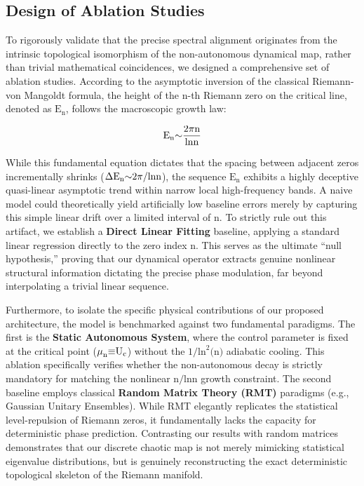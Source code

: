 \documentclass[fractalfract,article,submit,oneauthor,pdftex]{Definitions/mdpi}
\begin{document}
\subsection{Design of Ablation Studies}

To rigorously validate that the precise spectral alignment originates
from the intrinsic topological isomorphism of the non-autonomous
dynamical map, rather than trivial mathematical coincidences, we
designed a comprehensive set of ablation studies. According to the
asymptotic inversion of the classical Riemann-von Mangoldt formula, the
height of the \(\text{n}\)-th Riemann zero on the critical line, denoted
as \(\text{E}_{\text{n}}\), follows the macroscopic growth law:

\begin{equation}
\text{E}_{\text{n}}\text{\ensuremath{\sim}}\frac{\text{2}\text{\ensuremath{\pi}n}}{\text{ln}\text{n}}
\end{equation}

While this fundamental equation dictates that the spacing between
adjacent zeros incrementally shrinks
(\(\text{\ensuremath{\Delta}}\text{E}_{\text{n}}\text{\ensuremath{\sim}2}\text{\ensuremath{\pi}}\text{/ln}\text{n}\)),
the sequence \(\text{E}_{\text{n}}\) exhibits a highly deceptive
quasi-linear asymptotic trend within narrow local high-frequency bands.
A naive model could theoretically yield artificially low baseline errors
merely by capturing this simple linear drift over a limited interval of
\(\text{n}\). To strictly rule out this artifact, we establish a
\textbf{Direct Linear Fitting} baseline, applying a standard linear
regression directly to the zero index \(\text{n}\). This serves as the
ultimate ``null hypothesis,'' proving that our dynamical operator
extracts genuine nonlinear structural information dictating the precise
phase modulation, far beyond interpolating a trivial linear sequence.

Furthermore, to isolate the specific physical contributions of our
proposed architecture, the model is benchmarked against two fundamental
paradigms. The first is the \textbf{Static Autonomous System}, where the
control parameter is fixed at the critical point
(\(\text{\ensuremath{\mu}}_{\text{n}}\text{\ensuremath{\equiv}}\text{U}_{\text{c}}\)) without the
\(\text{1/}\text{ln}^{\text{2}}\text{(}\text{n}\text{)}\) adiabatic
cooling. This ablation specifically verifies whether the non-autonomous
decay is strictly mandatory for matching the nonlinear
\(\text{n}\text{/ln}\text{n}\) growth constraint. The second baseline
employs classical \textbf{Random Matrix Theory (RMT)} paradigms (e.g.,
Gaussian Unitary Ensembles). While RMT elegantly replicates the
statistical level-repulsion of Riemann zeros, it fundamentally lacks the
capacity for deterministic phase prediction. Contrasting our results
with random matrices demonstrates that our discrete chaotic map is not
merely mimicking statistical eigenvalue distributions, but is genuinely
reconstructing the exact deterministic topological skeleton of the
Riemann manifold.
\end{document}
